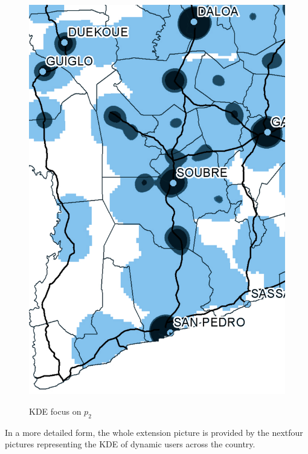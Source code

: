 \begin{figure}[h!]
{    \includegraphics[scale = 0.1]{results/images/kernel/21_detail_p2.pdf}
	\label{fig:subfig2_detail}
}
\caption[KDE focus on $p_2$]{KDE focus on $p_2$}
\label{fig:subfigureExample}
\end{figure}


In a more detailed form, the whole extension picture is provided by the nextfour pictures representing the KDE of dynamic users across the country.

\newpage

